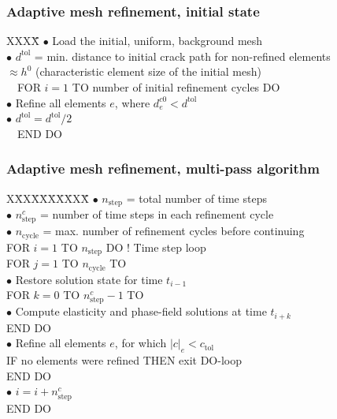 \documentclass{beamer}
\begin{document}
\begin{frame}
  \frametitle{Adaptive mesh refinement, initial state}

  \begin{tabbing} XXX\=X\=\kill
    $\bullet$ Load the initial, uniform, background mesh \\[2mm]
    $\bullet$ $d^\text{tol}$ \>\> = min. distance to initial crack path for non-refined elements \+\+\\
    $\approx h^0$ (characteristic element size of the initial mesh) \-\-\\[2mm]
    ~~FOR $i = 1$ TO number of initial refinement cycles DO \+\\[1mm]
    $\bullet$  Refine all elements $e$, where $d^{c0}_e < d^\text{tol}$ \\
    $\bullet$ $d^\text{tol} = d^\text{tol} / 2$ \-\\[1mm]
    ~~END DO
  \end{tabbing}
\end{frame}

\begin{frame}
  \frametitle{Adaptive mesh refinement, multi-pass algorithm}

  \begin{tabbing} X\=XX\=X\=X\=X\=X\=XX\=X\=\kill
    $\bullet$ \> $n_\text{step}$ \>\>\> = total number of time steps \\
    $\bullet$ \> $n_\text{step}^c$ \>\>\> = number of time steps in each refinement cycle \\
    $\bullet$ \> $n_\text{cycle}$ \>\>\> = max. number of refinement cycles before continuing \+\\[2mm] %
    FOR $i = 1$ TO $n_\text{step}$ DO ! Time step loop \+\+\\[2mm] %
    FOR $j = 1$ TO $n_\text{cycle}$ TO \+\+\\[1mm]
    $\bullet$ \> Restore solution state for time $t_{i-1}$ \+\\ %
    FOR $k = 0$ TO $n_\text{step}^c-1$ TO \+\\ %
    $\bullet$ \> Compute elasticity and phase-field solutions at time $t_{i+k}$ \-\\ %
    END DO \-\\
    $\bullet$ \> Refine all elements $e$, for which $|c|_e < c_\text{tol}$ \+\\
    IF no elements were refined THEN exit DO-loop \-\-\-\\ %
    END DO \-\\ %
    $\bullet$ \> $i = i + n_\text{step}^c$ \-\\
    END DO
  \end{tabbing}
\end{frame}
\end{document}

